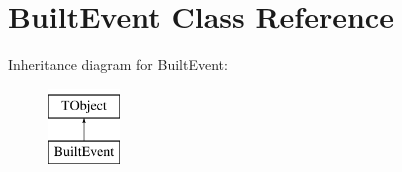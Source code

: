 \hypertarget{class_built_event}{\section{Built\-Event Class Reference}
\label{class_built_event}
}
Inheritance diagram for Built\-Event\-:\begin{figure}[H]
\begin{center}
\leavevmode
\includegraphics[height=2.000000cm]{class_built_event}
\end{center}
\end{figure}
